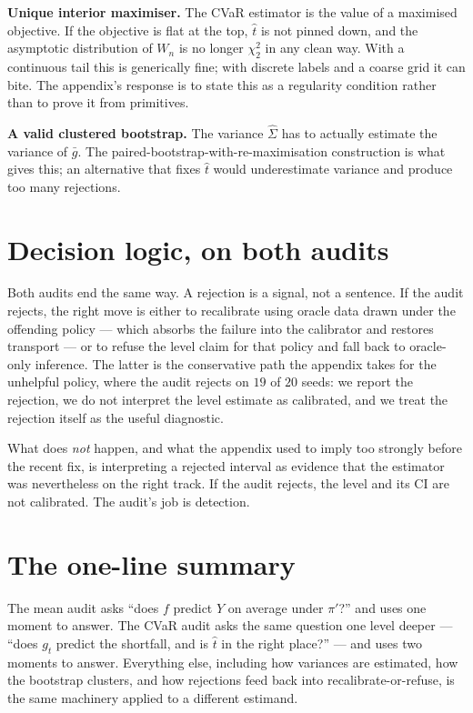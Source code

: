 \documentclass[11pt]{article}
\newcommand{\pprime}{\pi'}
\newcommand{\that}{\hat t}
\begin{document}
\textbf{Unique interior maximiser.} The CVaR estimator is the value of a maximised objective. If the objective is flat at the top, $\that$ is not pinned down, and the asymptotic distribution of $W_n$ is no longer $\chi^{2}_{2}$ in any clean way. With a continuous tail this is generically fine; with discrete labels and a coarse grid it can bite. The appendix's response is to state this as a regularity condition rather than to prove it from primitives.

\textbf{A valid clustered bootstrap.} The variance $\hat\Sigma$ has to actually estimate the variance of $\bar g$. The paired-bootstrap-with-re-maximisation construction is what gives this; an alternative that fixes $\that$ would underestimate variance and produce too many rejections.

\section*{Decision logic, on both audits}

Both audits end the same way. A rejection is a signal, not a sentence. If the audit rejects, the right move is either to recalibrate using oracle data drawn under the offending policy --- which absorbs the failure into the calibrator and restores transport --- or to refuse the level claim for that policy and fall back to oracle-only inference. The latter is the conservative path the appendix takes for the unhelpful policy, where the audit rejects on $19$ of $20$ seeds: we report the rejection, we do not interpret the level estimate as calibrated, and we treat the rejection itself as the useful diagnostic.

What does \emph{not} happen, and what the appendix used to imply too strongly before the recent fix, is interpreting a rejected interval as evidence that the estimator was nevertheless on the right track. If the audit rejects, the level and its CI are not calibrated. The audit's job is detection.

\section*{The one-line summary}

The mean audit asks ``does $f$ predict $Y$ on average under $\pprime$?'' and uses one moment to answer. The CVaR audit asks the same question one level deeper --- ``does $g_t$ predict the shortfall, and is $\that$ in the right place?'' --- and uses two moments to answer. Everything else, including how variances are estimated, how the bootstrap clusters, and how rejections feed back into recalibrate-or-refuse, is the same machinery applied to a different estimand.
\end{document}
